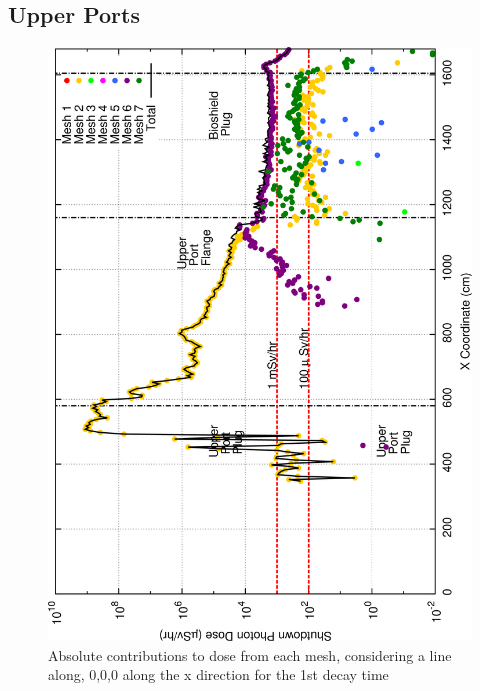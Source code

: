 \documentclass[12pt]{article}
\begin{document}
\subsection*{Upper Ports}
\begin{figure}[ht!]
\centering
\includegraphics[clip,scale=0.25]{../plots/crosstalk/b4c/up/dc1.png}
\caption{Absolute contributions to dose from each mesh, considering a line along, 0,0,0 along the x direction for the 1st decay time}
\label{fig:b4c_ct_up_dc1}
\end{figure}
\end{document}
